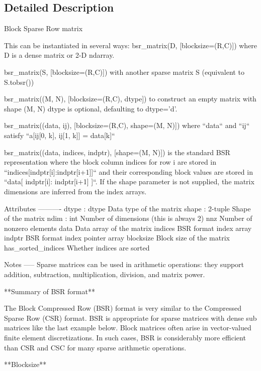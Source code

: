 \subsection{Detailed Description}
\begin{DoxyVerb}Block Sparse Row matrix

This can be instantiated in several ways:
    bsr_matrix(D, [blocksize=(R,C)])
        where D is a dense matrix or 2-D ndarray.

    bsr_matrix(S, [blocksize=(R,C)])
        with another sparse matrix S (equivalent to S.tobsr())

    bsr_matrix((M, N), [blocksize=(R,C), dtype])
        to construct an empty matrix with shape (M, N)
        dtype is optional, defaulting to dtype='d'.

    bsr_matrix((data, ij), [blocksize=(R,C), shape=(M, N)])
        where ``data`` and ``ij`` satisfy ``a[ij[0, k], ij[1, k]] = data[k]``

    bsr_matrix((data, indices, indptr), [shape=(M, N)])
        is the standard BSR representation where the block column
        indices for row i are stored in ``indices[indptr[i]:indptr[i+1]]``
        and their corresponding block values are stored in
        ``data[ indptr[i]: indptr[i+1] ]``.  If the shape parameter is not
        supplied, the matrix dimensions are inferred from the index arrays.

Attributes
----------
dtype : dtype
    Data type of the matrix
shape : 2-tuple
    Shape of the matrix
ndim : int
    Number of dimensions (this is always 2)
nnz
    Number of nonzero elements
data
    Data array of the matrix
indices
    BSR format index array
indptr
    BSR format index pointer array
blocksize
    Block size of the matrix
has_sorted_indices
    Whether indices are sorted

Notes
-----
Sparse matrices can be used in arithmetic operations: they support
addition, subtraction, multiplication, division, and matrix power.

**Summary of BSR format**

The Block Compressed Row (BSR) format is very similar to the Compressed
Sparse Row (CSR) format.  BSR is appropriate for sparse matrices with dense
sub matrices like the last example below.  Block matrices often arise in
vector-valued finite element discretizations.  In such cases, BSR is
considerably more efficient than CSR and CSC for many sparse arithmetic
operations.

**Blocksize**


\end{DoxyVerb}
